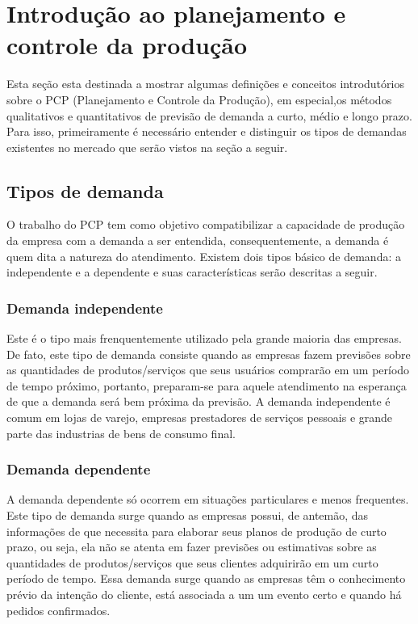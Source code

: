 \chapter{Introdução ao planejamento e controle da produção} 
\label{chap:introducao_ao_planejamento} 

Esta seção esta destinada a mostrar algumas definições e conceitos introdutórios sobre o PCP (Planejamento e Controle da Produção), em especial,os métodos qualitativos e quantitativos de previsão de demanda a curto, médio e longo prazo. Para isso, primeiramente é necessário entender e distinguir os tipos de demandas existentes no mercado que serão vistos na seção a seguir.  

\section{Tipos de demanda} 
\label{sec:introducao_ao_planejamento_sec1} 

O trabalho do PCP tem como objetivo compatibilizar a capacidade de produção da empresa com a demanda a ser entendida, consequentemente, a demanda é quem dita a natureza do atendimento. Existem dois tipos básico de demanda: a independente e a dependente e suas características serão descritas a seguir. 

\subsection{Demanda independente}

Este é o tipo mais frenquentemente utilizado pela grande maioria das empresas. De fato, este tipo de demanda consiste quando as empresas fazem previsões sobre as quantidades de produtos/serviços que seus usuários comprarão em um período de tempo próximo, portanto, preparam-se para aquele atendimento na esperança de que a demanda será bem próxima da previsão. A demanda independente é comum em lojas de varejo, empresas prestadores de serviços pessoais e grande parte das industrias de bens de consumo final.

\subsection{Demanda dependente}

A demanda dependente só ocorrem em situações particulares e menos frequentes. Este tipo de demanda surge quando as empresas possui, de antemão, das informações de que necessita para elaborar seus planos de produção de curto prazo, ou seja, ela não se atenta em fazer previsões ou estimativas sobre as quantidades de produtos/serviços que seus clientes adquirirão em um curto período de tempo. Essa demanda surge quando as empresas têm o conhecimento prévio da intenção do cliente, está associada a um um evento certo e quando há pedidos confirmados.

